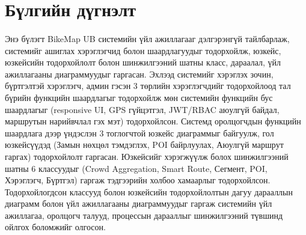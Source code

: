 \section{Бүлгийн дүгнэлт}
\paragraph{} Энэ бүлэгт BikeMap UB системийн үйл ажиллагааг дэлгэрэнгүй тайлбарлаж, системийг ашиглах хэрэглэгчид болон шаардлагуудыг тодорхойлж, юзкейс, юзкейсийн тодорхойлолт болон шинжилгээний шатны класс, дараалал, үйл ажиллагааны диаграммуудыг гаргасан. Эхлээд системийг хэрэглэх зочин, бүртгэлтэй хэрэглэгч, админ гэсэн 3 төрлийн хэрэглэгчдийг тодорхойлоод тал бүрийн функцийн шаардлагыг тодорхойлж мөн системийн функцийн бус шаардлагыг (responsive UI, GPS гүйцэтгэл, JWT/RBAC аюулгүй байдал, маршрутын нарийвчлал гэх мэт) тодорхойлсон. Системд оролцогчдын функцийн шаардлага дээр үндэслэн 3 тоглогчтой юзкейс диаграммыг байгуулж, гол юзкейсүүдэд (Замын нөхцөл тэмдэглэх, POI байрлуулах, Аюулгүй маршрут гаргах) тодорхойлолт гаргасан. Юзкейсийг хэрэгжүүлж болох шинжилгээний шатны 6 классуудыг (Crowd Aggregation, Smart Route, Сегмент, POI, Хэрэглэгч, Бүртгэл) гаргаж тэдгээрийн холбоо хамаарлыг тодорхойлсон. Тодорхойлогдсон классууд болон юзкейсийн тодорхойлолтын дагуу дарааллын диаграмм болон үйл ажиллагааны диаграммуудыг гаргаж системийн үйл ажиллагаа, оролцогч талууд, процессын дарааллыг шинжилгээний түвшинд ойлгох боломжийг олгосон.
